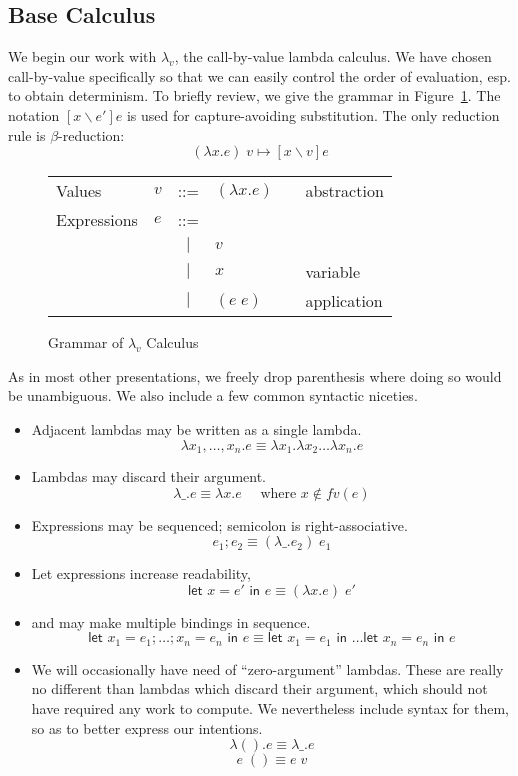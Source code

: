 \documentclass[11pt]{article}
\newcommand\x{\lambda x}
\newcommand{\letin}[2]{\textsf{let }#1\textsf{ in }#2}
\begin{document}
\subsection{Base Calculus}

We begin our work with $\lambda_v$, the call-by-value lambda calculus.
We have chosen call-by-value specifically so that we can easily control the order of evaluation, esp. to obtain determinism.
To briefly review, we give the grammar in Figure~\ref{fig:lambdaCalculus}.
The notation $[x \backslash e']e$ is used for capture-avoiding substitution.
The only reduction rule is $\beta$-reduction:
$$(\x.e)\;v \mapsto [x \backslash v]e$$

\begin{figure}[H]
\caption{Grammar of $\lambda_v$ Calculus}
\label{fig:lambdaCalculus}

\begin{tabular}{llclll}
Values & $v$ & ::= & $(\lambda x.e)$ && abstraction\\
Expressions & $e$ & ::= & \\
& & $|$ & $v$ && \\
& & $|$ & $x$ && variable \\
& & $|$ & $(e\;e)$ && application \\
\end{tabular}
\end{figure}


As in most other presentations, we freely drop parenthesis where doing so would be unambiguous.
We also include a few common syntactic niceties.
\begin{itemize}
\item Adjacent lambdas may be written as a single lambda.
	$$\x_1,\ldots,x_n.e \equiv \x_1.\x_2\ldots\x_n.e$$
\item Lambdas may discard their argument.
	$$\lambda\_.e \equiv \x.e \quad\textrm{ where }x \notin fv(e)$$
\item Expressions may be sequenced; semicolon is right-associative.
	$$e_1; e_2 \equiv (\lambda\_.e_2)\;e_1$$
\item Let expressions increase readability,
	$$\letin{x = e'}{e} \equiv (\x.e)\;e'$$
\item and may make multiple bindings in sequence.
	$$\letin{x_1 = e_1; \ldots; x_n = e_n}{e} \equiv \letin{x_1 = e_1}{\ldots\letin{x_n = e_n}{e}}$$
\item We will occasionally have need of ``zero-argument'' lambdas.
These are really no different than lambdas which discard their argument, which should not have required any work to compute.
We nevertheless include syntax for them, so as to better express our intentions.
	$$\lambda().e \equiv \lambda\_.e$$
	$$e\;() \equiv e\;v$$
\end{itemize}
\end{document}
